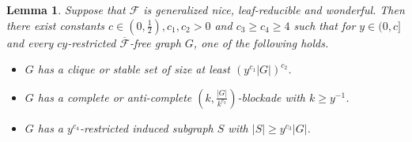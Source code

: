 \documentclass[a4paper,11pt]{article}
\newtheorem{lemma}[theorem]{Lemma}
\begin{document}
    \begin{lemma}\label{lem:main-once-a-block-turn2}
        Suppose that $\mathcal{F}$ is generalized nice, leaf-reducible and wonderful. Then
        there exist constants $c\in (0,\frac{1}{2}),c_1,c_2>0$ and $c_3\geq c_4\geq 4$ such that for $y\in (0,c]$ and every $cy$-restricted $\overline{\mathcal{F}}$-free graph $G$, one of the following holds.
        \begin{itemize}
            \item[$(1)$] $G$ has a clique or stable set of size at least $(y^{c_1}|G|)^{c_2}$.
            
            \item[$(2)$] $G$ has a complete or anti-complete $(k,\frac{|G|}{k^{c_3}})$-blockade with $k\geq y^{-1}$.
            
            \item[$(3)$] $G$ has a $y^{c_4}$-restricted induced subgraph $S$ with $|S|\geq y^{c_3}|G|$.
            
        \end{itemize}
    \end{lemma}
    
\end{document}
